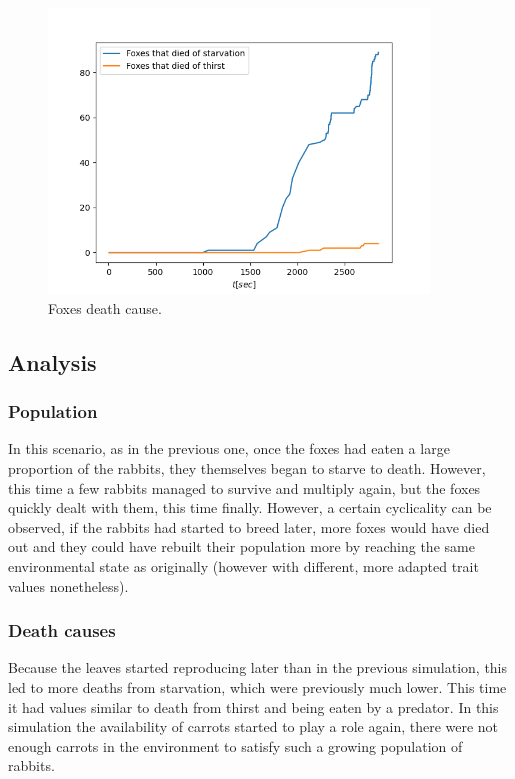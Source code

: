 \begin{figure}[H]
    \centering
    \includegraphics[width=0.9\textwidth]{Images/SimulationResults/Simulation_6_Foxes that died of starvation_Foxes that died of thirst.png}
    \caption{Foxes death cause.}
    \label{fig:simulation4FoxDeathCause}
\end{figure}

\subsection{Analysis}
\subsubsection{Population}
In this scenario, as in the previous one, once the foxes had eaten a large proportion of the rabbits, they themselves began to starve to death. However, this time a few rabbits managed to survive and multiply again, but the foxes quickly dealt with them, this time finally. However, a certain cyclicality can be observed, if the rabbits had started to breed later, more foxes would have died out and they could have rebuilt their population more by reaching the same environmental state as originally (however with different, more adapted trait values nonetheless).

\subsubsection{Death causes}
Because the leaves started reproducing later than in the previous simulation, this led to more deaths from starvation, which were previously much lower. This time it had values similar to death from thirst and being eaten by a predator. In this simulation the availability of carrots started to play a role again, there were not enough carrots in the environment to satisfy such a growing population of rabbits.

